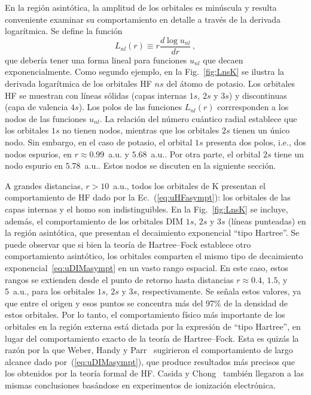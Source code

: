 En la región asintótica, la amplitud de los orbitales es minúscula y 
resulta conveniente examinar su comportamiento en detalle a través de la 
derivada logarítmica. Se define la función
\begin{equation}
L_{nl}(r) \equiv r \frac{d \log{u_{nl}}}{d r}\,,
\label{eq:Lnl}
\end{equation}
que debería tener una forma lineal para funciones $u_{nl}$ que decaen 
exponencialmente. Como segundo ejemplo, en la Fig.~\ref{fig:LnsK} se 
ilustra la derivada logarítmica de los orbitales HF $ns$ del átomo de 
potasio. Los orbitales HF se muestran con líneas sólidas (capas internas 
$1s$, $2s$ y $3s$) y discontinuas (capa de valencia $4s$). Los polos de 
las funciones $L_{nl}(r)$ corrresponden a los nodos de las funciones 
$u_{nl}$. La relación del número cuántico radial establece que los 
orbitales $1s$ no tienen nodos, mientras que los orbitales $2s$ tienen 
un único nodo. Sin embargo, en el caso de potasio, el orbital $1s$ 
presenta dos polos, i.e., dos nodos espurios, en $r\approx 0.99$~a.u. y 
$5.68$~a.u.. Por otra parte, el orbital $2s$ tiene un nodo espurio en 
$5.78$~a.u.. Estos nodos se discuten en la siguiente sección.

A grandes distancias, $r>10$~a.u., todos los orbitales de K presentan el 
comportamiento de HF dado por la Ec.~(\ref{eq:uHFasympt}): los orbitales 
de las capas internas y el \acs{homo} son indistinguibles. En la 
Fig.~\ref{fig:LnsK} se incluye, además, el comportamiento de los 
orbitales DIM $1s$, $2s$ y $3s$ (líneas punteadas) en la región 
asintótica, que presentan el decaimiento exponencial ``tipo Hartree''. 
Se puede observar que si bien la teoría de Hartree--Fock establece otro 
comportamiento asintótico, los orbitales comparten el mismo tipo de 
decaimiento exponencial~\ref{eq:uDIMasympt} en un 
vasto rango espacial. En este caso, estos rangos se extienden desde el 
punto de retorno hasta distancias $r\approx 0.4$, $1.5$, y 5~a.u., para 
los orbitales $1s$, $2s$ y $3s$, respectivamente. Se señala estos 
valores, ya que entre el origen y esos puntos se concentra más del 97\% 
de la densidad de estos orbitales. Por lo tanto, el 
comportamiento físico más importante de los orbitales en la región 
externa está dictada por la expresión de ``tipo Hartree'', en lugar del 
comportamiento exacto de la teoría de Hartree--Fock. Esta es quizás la 
razón por la que Weber, Handy y Parr~\cite{Weber:70} sugirieron 
el comportamiento de largo alcance dado por~(\ref{eq:uDIMasympt}), 
que produce resultados más precisos que los obtenidos por la teoría 
formal de HF. Casida y Chong~\cite{Casida:89} también llegaron a las 
mismas conclusiones basándose en experimentos de ionización electrónica. 

